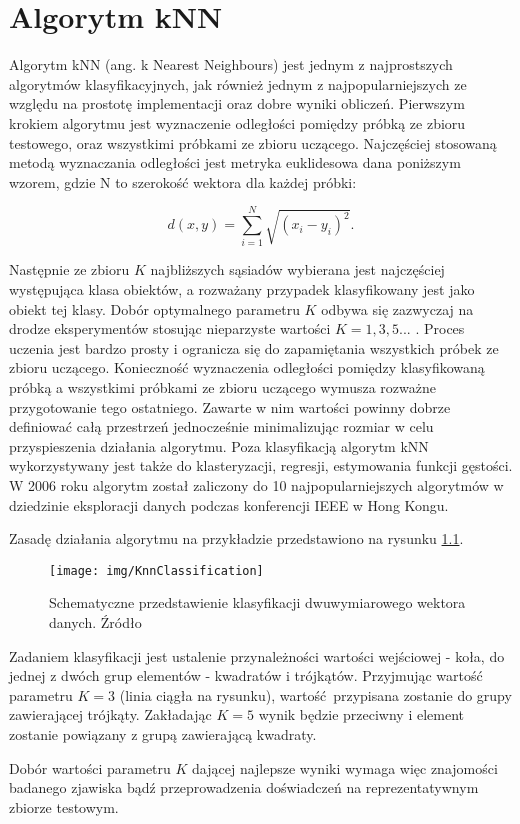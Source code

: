 \chapter{Algorytm kNN}
\label{chap:knn}
\large{Algorytm kNN (ang. k Nearest Neighbours)  jest jednym z najprostszych algorytmów klasyfikacyjnych, jak również jednym z najpopularniejszych ze względu na prostotę implementacji oraz dobre wyniki obliczeń. Pierwszym krokiem algorytmu jest wyznaczenie odległości pomiędzy próbką ze zbioru testowego, oraz wszystkimi próbkami ze zbioru uczącego. Najczęściej stosowaną metodą wyznaczania odległości jest metryka euklidesowa dana poniższym wzorem, gdzie N to szerokość wektora dla każdej próbki:

\begin{equation}
d(x,y) = \sum_{i=1}^{N} \sqrt{(x_i - y_i)^2}.
\end{equation}

Następnie ze zbioru $K$ najbliższych sąsiadów wybierana jest najczęściej występująca klasa obiektów, a rozważany przypadek klasyfikowany jest jako obiekt tej klasy. Dobór optymalnego parametru $K$ odbywa się zazwyczaj na drodze eksperymentów stosując nieparzyste wartości $K=1,3,5...$ . Proces uczenia jest bardzo prosty i ogranicza się do zapamiętania wszystkich próbek ze zbioru uczącego. Konieczność wyznaczenia odległości pomiędzy klasyfikowaną próbką a wszystkimi próbkami ze zbioru uczącego wymusza rozważne przygotowanie tego ostatniego. Zawarte w nim wartości powinny dobrze definiować całą przestrzeń jednocześnie minimalizując rozmiar w celu przyspieszenia działania algorytmu.  Poza klasyfikacją algorytm kNN wykorzystywany jest także do klasteryzacji, regresji, estymowania funkcji gęstości. W 2006 roku algorytm został zaliczony do 10 najpopularniejszych algorytmów w dziedzinie eksploracji danych podczas konferencji IEEE w Hong Kongu.}

Zasadę działania algorytmu na przykładzie przedstawiono na rysunku \ref{fig:knn-idea}.

\begin{figure}[H]
	\centering
	\texttt{[image: img/KnnClassification]}
	\caption{Schematyczne przedstawienie klasyfikacji dwuwymiarowego wektora danych. Źródło \cite{knn-wiki}}
	\label{fig:knn-idea}
\end{figure}

Zadaniem klasyfikacji jest ustalenie przynależności wartości wejściowej - koła, do jednej z dwóch grup elementów - kwadratów i trójkątów. Przyjmując wartość parametru $K=3$ (linia ciągła na rysunku), wartość przypisana zostanie do grupy zawierającej trójkąty. Zakładając $K=5$ wynik będzie przeciwny i element zostanie powiązany z grupą zawierającą kwadraty.

Dobór wartości parametru $K$ dającej najlepsze wyniki wymaga więc znajomości badanego zjawiska bądź przeprowadzenia doświadczeń na reprezentatywnym zbiorze testowym.

